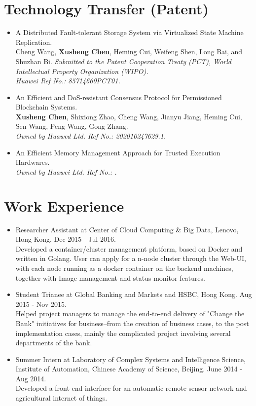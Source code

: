 \documentclass[a4paper,8pt]{article} %
\newcommand{\authors}[1]{{\small \fontfamily{cmss}\selectfont #1}}
\newcommand{\conference}[1]{\textit{\small \fontfamily{cmss}\selectfont #1}}
\newcommand{\info}[1]{{\footnotesize \fontfamily{cmss}\selectfont #1}}
\begin{document}
\section{Technology Transfer (Patent)}
\begin{itemize}
\item A Distributed Fault-tolerant Storage System via Virtualized State Machine
Replication. \\
\authors{Cheng Wang, \textbf{Xusheng Chen}, Heming Cui, Weifeng Shen, Long Bai, and Shuzhan Bi.}
\conference{Submitted to the Patent Cooperation Treaty (PCT), World Intellectual
Property Organization (WIPO). \\Huawei Ref No.: 85714660PCT01.} \\

\item An Efficient and DoS-resistant Consensus Protocol for Permissioned Blockchain Systems.\\
\authors{\textbf{Xusheng Chen}, Shixiong Zhao, Cheng Wang, Jianyu Jiang, Heming Cui, Sen Wang, Peng Wang, Gong Zhang.}\\
\conference{Owned by Huawed Ltd. Ref No.: 202010247629.1.} \\

\item An Efficient Memory Management Approach for Trusted Execution Hardwares. \\
\conference{Owned by Huawei Ltd. Ref No.: .}
\end{itemize}

\section{Work Experience}


\begin{itemize}
\item Researcher Assistant at Center of Cloud Computing \& Big Data, Lenovo, Hong Kong. Dec 2015 - Jul 2016. \\
\info{Developed a container/cluster management platform, based on Docker and
written in Golang. User can apply for a n-node cluster through the Web-UI, with
each node running as a docker container on the backend machines, together with
Image management and status monitor features.} \\


\item Student Trianee at Global Banking and Markets and HSBC, Hong Kong. Aug 2015 - Nov 2015. \\ 
\info{Helped project managers to manage the end-to-end delivery of "Change the
Bank" initiatives for business--from the creation of business cases, to the post
implementation cases, mainly the complicated project involving several
departments of the bank.}\\


\item Summer Intern at Laboratory of Complex Systems and Intelligence Science,
Institute of Automation, Chinese Academy of Science, Beijing. 
June 2014 - Aug 2014.\\
\info{Developed a front-end interface for an automatic remote sensor network and agricultural internet of things.}
\end{itemize}
\end{document}
